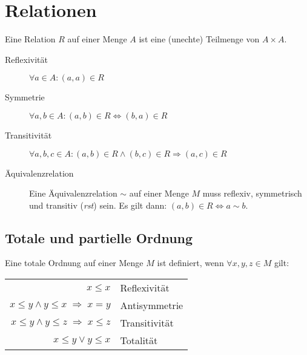\section{Relationen}

Eine Relation $R$ auf einer Menge $A$ ist eine (unechte) Teilmenge von $A\times A$.

\begin{description}
  \item [Reflexivität] 
	$\forall a\in A:(a,a)\in R$
  \item [Symmetrie] 
	$\forall a,b\in A:(a,b)\in R \iff (b,a)\in R$
  \item [Transitivität] 
	$\forall a,b,c\in A:(a,b)\in R\land(b,c)\in R\Rightarrow(a,c)\in R$
  \item [Äquivalenzrelation] Eine 
	Äquivalenzrelation $\sim$ auf einer Menge $M$ muss reflexiv, symmetrisch und transitiv (\emph{rst}) sein.
	Es gilt dann: $(a,b)\in R \iff a\sim b$.
\end{description}


\subsection{Totale und partielle Ordnung}
Eine totale Ordnung auf einer Menge $M$ ist definiert, wenn $\forall x,y,z \in M$ gilt:
\noindent\begin{center}
\begin{tabular}{rl}
	                                        $x \leq x$ & Reflexivität  \\
	     $x \leq y \land y \leq x\; \Rightarrow\; x=y$ & Antisymmetrie \\
	$x \leq y \land y \leq z\; \Rightarrow\; x \leq z$ & Transitivität \\
	                          $x \leq y \lor y \leq x$ & Totalität
\end{tabular}
\end{center}

